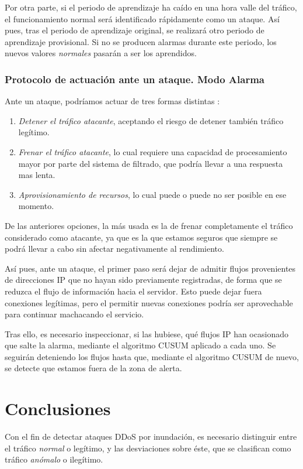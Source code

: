 Por otra parte, si el periodo de aprendizaje ha caído en una hora valle del tráfico, el funcionamiento normal será 
identificado rápidamente como un ataque. Así pues, tras el periodo de aprendizaje original, se realizará otro periodo 
de aprendizaje provisional. Si no se producen alarmas durante este periodo, los nuevos valores \emph{normales} pasarán 
a ser los aprendidos.

\subsubsection{Protocolo de actuación ante un ataque. Modo Alarma}

Ante un ataque, podríamos actuar de tres formas distintas \cite{Raghavan}:
\begin{enumerate}
 \item\emph{Detener el tráfico atacante}, aceptando el riesgo de detener también tráfico legítimo.
 \item\emph{Frenar el tráfico atacante}, lo cual requiere una capacidad de procesamiento mayor por parte del sistema de 
filtrado, que podría llevar a una respuesta mas lenta.
 \item\emph{Aprovisionamiento de recursos}, lo cual puede o puede no ser posible en ese momento.
\end{enumerate}

De las anteriores opciones, la más usada es la de frenar completamente el tráfico considerado como atacante, ya que es 
la que estamos seguros que siempre se podrá llevar a cabo sin afectar negativamente al rendimiento.

Así pues, ante un ataque, el primer paso será dejar de admitir flujos provenientes de direcciones \gls{IP} que no 
hayan sido previamente registradas, de forma que se reduzca el flujo de información hacia el servidor. Esto puede dejar 
fuera conexiones legítimas, pero el permitir nuevas conexiones podría ser aprovechable para continuar machacando el 
servicio.

Tras ello, es necesario inspeccionar, si las hubiese, qué flujos \gls{IP} han ocasionado que salte la alarma, mediante 
el algoritmo \gls{CUSUM} aplicado a cada uno. Se seguirán deteniendo los flujos hasta que, mediante el algoritmo 
\gls{CUSUM} de nuevo, se detecte que estamos fuera de la zona de alerta.

\section{Conclusiones}
Con el fin de detectar ataques \gls{DDoS} por inundación, es necesario distinguir entre el tráfico \emph{normal} o 
legítimo, y las desviaciones sobre éste, que se clasifican como tráfico \emph{anómalo} o ilegítimo.

